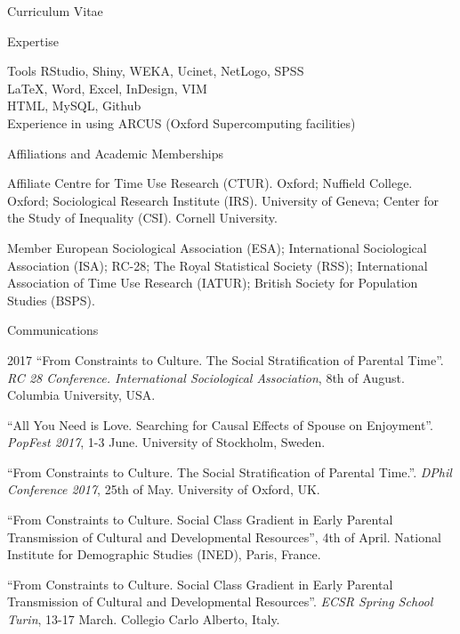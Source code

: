 \documentclass[12pt,a4paper]{article}
\newcommand*{\ac}[1]{\mbox{#1}}
\begin{document}
\begin{cv}{Curriculum Vitae}
\begin{cvlist}{\ac{Expertise}}
  \item[Tools] RStudio, Shiny, \ac{WEKA}, Ucinet, NetLogo, \ac{SPSS} \\ \LaTeX, Word, Excel, InDesign, \ac{VIM} \\ 
 \ac{HTML},  MySQL,  Github \\ 
 Experience in using ARCUS (Oxford Supercomputing facilities)
  \end{cvlist}

\begin{cvlist}{Affiliations and Academic Memberships}
	\item[Affiliate] Centre for Time Use Research (CTUR). Oxford; Nuffield College. Oxford; Sociological Research Institute (IRS). University of Geneva; Center for the Study of Inequality (CSI). Cornell University. 
	\item[Member] European Sociological Association (ESA); International Sociological Association (ISA); RC-28; The Royal Statistical Society (RSS); International Association of Time Use Research (IATUR); 
	British Society for Population Studies (BSPS). 
\end{cvlist}

\begin{cvlist}{Communications}
	
		\item[2017] ``From Constraints to Culture. The Social Stratification of Parental Time''. \emph{RC 28 Conference. International Sociological Association}, 8th of August. Columbia University, USA. 
				
	\item[] ``All You Need is Love. Searching for Causal Effects of Spouse on Enjoyment''. \emph{PopFest 2017}, 1-3 June. University of Stockholm, Sweden. 
	
	\item[] ``From Constraints to Culture.
The Social Stratification of Parental Time.''. \emph{DPhil Conference 2017}, 25th of May. University of Oxford, UK. 
	
	\item[]  ``From Constraints to Culture. Social Class Gradient in Early Parental Transmission of Cultural and Developmental Resources'', 4th of April. National Institute for Demographic Studies (INED), Paris, France. 
	
	\item[]  ``From Constraints to Culture. Social Class Gradient in Early Parental Transmission of Cultural and Developmental Resources''. \emph{ECSR Spring School Turin}, 13-17 March. Collegio Carlo Alberto, Italy. 
	

\end{cvlist}
\end{cv}
\end{document}
